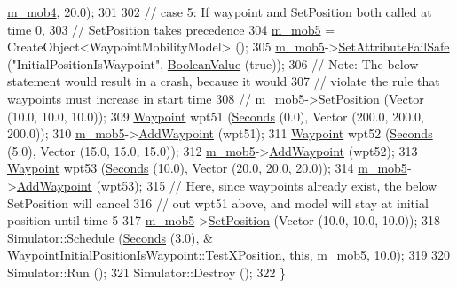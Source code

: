 \begin{DoxyCode}
      \hyperlink{classWaypointInitialPositionIsWaypoint_a314ea7cc7f3a519067fb64153e6f3e2f}{m\_mob4}, 20.0);
301 
302   \textcolor{comment}{// case 5:  If waypoint and SetPosition both called at time 0,}
303   \textcolor{comment}{// SetPosition takes precedence}
304   \hyperlink{classWaypointInitialPositionIsWaypoint_a450fe8fc533ad5fe8a6940f21b148f5f}{m\_mob5} = CreateObject<WaypointMobilityModel> ();
305   \hyperlink{classWaypointInitialPositionIsWaypoint_a450fe8fc533ad5fe8a6940f21b148f5f}{m\_mob5}->\hyperlink{classns3_1_1ObjectBase_aa7d333004e970f925a4ed5df275541b5}{SetAttributeFailSafe} (\textcolor{stringliteral}{"InitialPositionIsWaypoint"}, 
      \hyperlink{classns3_1_1BooleanValue}{BooleanValue} (\textcolor{keyword}{true}));
306   \textcolor{comment}{// Note:  The below statement would result in a crash, because it would}
307   \textcolor{comment}{// violate the rule that waypoints must increase in start time}
308   \textcolor{comment}{// m\_mob5->SetPosition (Vector (10.0, 10.0, 10.0));}
309   \hyperlink{classns3_1_1Waypoint}{Waypoint} wpt51 (\hyperlink{group__timecivil_ga33c34b816f8ff6628e33d5c8e9713b9e}{Seconds} (0.0), Vector (200.0, 200.0, 200.0));
310   \hyperlink{classWaypointInitialPositionIsWaypoint_a450fe8fc533ad5fe8a6940f21b148f5f}{m\_mob5}->\hyperlink{classns3_1_1WaypointMobilityModel_ae16c90c21c463289bbea2b3499a94643}{AddWaypoint} (wpt51);
311   \hyperlink{classns3_1_1Waypoint}{Waypoint} wpt52 (\hyperlink{group__timecivil_ga33c34b816f8ff6628e33d5c8e9713b9e}{Seconds} (5.0), Vector (15.0, 15.0, 15.0));
312   \hyperlink{classWaypointInitialPositionIsWaypoint_a450fe8fc533ad5fe8a6940f21b148f5f}{m\_mob5}->\hyperlink{classns3_1_1WaypointMobilityModel_ae16c90c21c463289bbea2b3499a94643}{AddWaypoint} (wpt52);
313   \hyperlink{classns3_1_1Waypoint}{Waypoint} wpt53 (\hyperlink{group__timecivil_ga33c34b816f8ff6628e33d5c8e9713b9e}{Seconds} (10.0), Vector (20.0, 20.0, 20.0));
314   \hyperlink{classWaypointInitialPositionIsWaypoint_a450fe8fc533ad5fe8a6940f21b148f5f}{m\_mob5}->\hyperlink{classns3_1_1WaypointMobilityModel_ae16c90c21c463289bbea2b3499a94643}{AddWaypoint} (wpt53);
315   \textcolor{comment}{// Here, since waypoints already exist, the below SetPosition will cancel}
316   \textcolor{comment}{// out wpt51 above, and model will stay at initial position until time 5}
317   \hyperlink{classWaypointInitialPositionIsWaypoint_a450fe8fc533ad5fe8a6940f21b148f5f}{m\_mob5}->\hyperlink{classns3_1_1MobilityModel_ac584b3d5a309709d2f13ed6ada1e7640}{SetPosition} (Vector (10.0, 10.0, 10.0));
318   Simulator::Schedule (\hyperlink{group__timecivil_ga33c34b816f8ff6628e33d5c8e9713b9e}{Seconds} (3.0), &
      \hyperlink{classWaypointInitialPositionIsWaypoint_aca01ac096251d1abe559ea98cad123e6}{WaypointInitialPositionIsWaypoint::TestXPosition}, \textcolor{keyword}{this}, 
      \hyperlink{classWaypointInitialPositionIsWaypoint_a450fe8fc533ad5fe8a6940f21b148f5f}{m\_mob5}, 10.0);
319 
320   Simulator::Run ();
321   Simulator::Destroy ();
322 \}
\end{DoxyCode}


